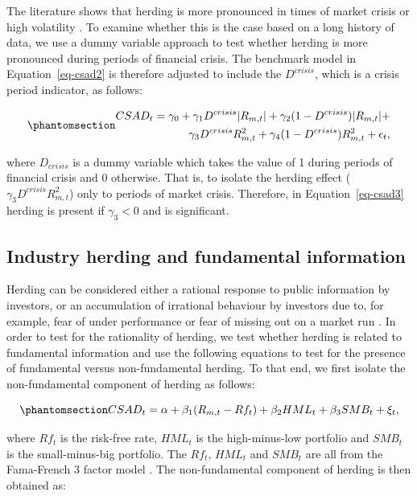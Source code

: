 \documentclass[
  letterpaper,
  DIV=11,
  numbers=noendperiod]{scrartcl}
\begin{document}
The literature shows that herding is more pronounced in times of market
crisis or high volatility \citep{balcilar2014drives}. To examine whether
this is the case based on a long history of data, we use a dummy
variable approach to test whether herding is more pronounced during
periods of financial crisis. The benchmark model in
Equation~\ref{eq-csad2} is therefore adjusted to include the
\(D^{crisis}\), which is a crisis period indicator, as follows:

\begin{equation}\phantomsection\label{eq-csad3}{
\begin{aligned}
CSAD_{t} = \gamma_0 +  \gamma_1D^{crisis}|R_{m, t}| + \gamma_2(1 - D^{crisis})|R_{m,t}| + \\  \gamma_3D^{crisis}R_{m, t}^2 + \gamma_4(1-D^{crisis})R_{m,t}^2 + \epsilon_{t},
\end{aligned}
}\end{equation}

where \(D_{crisis}\) is a dummy variable which takes the value of 1
during periods of financial crisis and 0 otherwise. That is, to isolate
the herding effect (\(\gamma_3D^{crisis}R_{m, t}^2\)) only to periods of
market crisis. Therefore, in Equation~\ref{eq-csad3} herding is present
if \(\gamma_3 < 0\) and is significant.

\subsection{Industry herding and fundamental
information}\label{industry-herding-and-fundamental-information}

Herding can be considered either a rational response to public
information by investors, or an accumulation of irrational behaviour by
investors due to, for example, fear of under performance or fear of
missing out on a market run \citep[see][]{Bikhchandani2001}. In order to
test for the rationality of herding, we test whether herding is related
to fundamental information and use the following equations to test for
the presence of fundamental versus non-fundamental herding. To that end,
we first isolate the non-fundamental component of herding as follows:

\begin{equation}\phantomsection\label{eq-info}{
CSAD_t = \alpha + \beta_1(R_{m,t} - Rf_t) + \beta_2HML_t + \beta_3SMB_t + \xi_t,
}\end{equation}

where \(Rf_t\) is the risk-free rate, \(HML_t\) is the high-minus-low
portfolio and \(SMB_t\) is the small-minus-big portfolio. The \(Rf_t\),
\(HML_t\) and \(SMB_t\) are all from the Fama-French 3 factor model
\citep[see][]{fama1993common}. The non-fundamental component of herding
is then obtained as:
\end{document}
